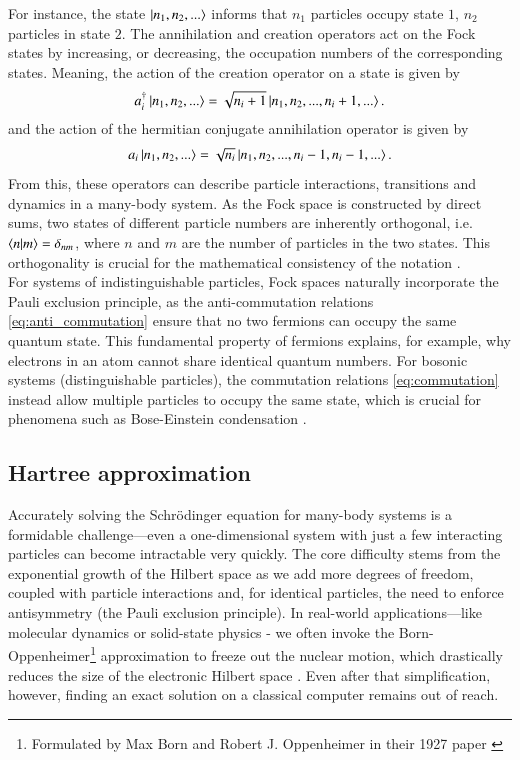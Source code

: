 \documentclass{subfiles}
\begin{document}
For instance, the state $\ket{n_1, n_2, ...}$ informs that $n_1$ particles occupy state $1$, $n_2$ particles  in state $2$. The annihilation and creation operators act on the Fock states by increasing, or decreasing, the occupation numbers of the corresponding states. Meaning, the action of the creation operator on a state is given by
\begin{align*}
    a^\dagger_i\ket{n_1, n_2, ...} = \sqrt{n_i + 1}\ket{n_1, n_2, ..., n_i + 1, ...}.
\end{align*}
and the action of the hermitian conjugate annihilation operator is given by
\begin{align*}
    a_i\ket{n_1, n_2, ...} = \sqrt{n_i}\ket{n_1, n_2, ...,n_i-1, n_i - 1, ...}.
\end{align*}
From this, these operators can describe particle interactions, transitions and dynamics in a many-body system. As the Fock space is constructed by direct sums, two states of different particle numbers are inherently orthogonal, i.e. $\braket{n|m} = \delta_{nm}$, where $n$ and $m$ are the number of particles in the two states. This orthogonality is crucial for the mathematical consistency of the notation \cite{helgaker2013molecular, shavitt2009many}.
\\

For systems of indistinguishable particles, Fock spaces naturally incorporate the Pauli exclusion principle, as the anti-commutation relations \eqref{eq:anti_commutation} ensure that no two fermions can occupy the same quantum state. This fundamental property of fermions explains, for example, why electrons in an atom cannot share identical quantum numbers. For bosonic systems (distinguishable particles), the commutation relations \eqref{eq:commutation} instead allow multiple particles to occupy the same state, which is crucial for phenomena such as Bose-Einstein condensation \cite{pethick2008bose}.


\subsection{Hartree approximation}\label{sec:hartree_theory}
Accurately solving the Schrödinger equation for many-body systems is a formidable challenge—even a one-dimensional system with just a few interacting particles can become intractable very quickly. The core difficulty stems from the exponential growth of the Hilbert space as we add more degrees of freedom, coupled with particle interactions and, for identical particles, the need to enforce antisymmetry (the Pauli exclusion principle). In real-world applications—like molecular dynamics or solid-state physics - we often invoke the Born-Oppenheimer\footnote{Formulated by Max Born and Robert J. Oppenheimer in their 1927 paper \cite{Born_Oppenheimer_1927}} approximation to freeze out the nuclear motion, which drastically reduces the size of the electronic Hilbert space \cite{helgaker2013molecular, szabo1996modern}. Even after that simplification, however, finding an exact solution on a classical computer remains out of reach.
\\ 
\end{document}

